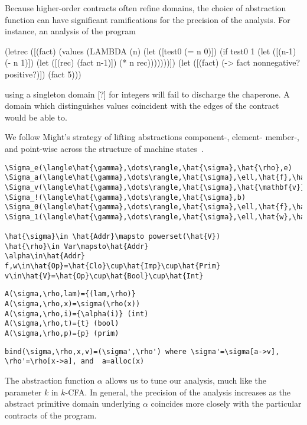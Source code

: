 \documentclass{sigplanconf}
\begin{document}
Because higher-order contracts often refine domains, the choice of abstraction function can have significant ramifications for the precision of the analysis.
For instance, an analysis of the program
\begin{schemedisplay}
(letrec ([(fact) (values (LAMBDA (n)
                          (let ([test0 (= n 0)])
                            (if test0
                                1
                                (let ([(n-1) (- n 1)])
                                  (let ([(rec) (fact n-1)])
                                    (* n rec)))))))])
  (let ([(fact) (-> fact nonnegative? positive?)])
    (fact 5)))
\end{schemedisplay}
using a singleton domain [?] for integers will fail to discharge the chaperone.
A domain which distinguishes values coincident with the edges of the contract would be able to.

We follow Might's strategy of lifting abstractions component-, element- member-, and point-wise across the structure of machine states~\cite{van2010abstracting}.

\begin{verbatim}
\Sigma_e(\langle\hat{\gamma},\dots\rangle,\hat{\sigma},\hat{\rho},e)
\Sigma_a(\langle\hat{\gamma},\dots\rangle,\hat{\sigma},\ell,\hat{f},\hat{\mathbf{v}})
\Sigma_v(\langle\hat{\gamma},\dots\rangle,\hat{\sigma},\hat{\mathbf{v}})
\Sigma_!(\langle\hat{\gamma},\dots\rangle,\hat{\sigma},b)
\Sigma_0(\langle\hat{\gamma},\dots\rangle,\hat{\sigma},\ell,\hat{f},\hat{w},\hat{\mathbf{v}})
\Sigma_1(\langle\hat{\gamma},\dots\rangle,\hat{\sigma},\ell,\hat{w},\hat{\mathbf{v}})

\hat{\sigma}\in \hat{Addr}\mapsto powerset(\hat{V})
\hat{\rho}\in Var\mapsto\hat{Addr}
\alpha\in\hat{Addr}
f,w\in\hat{Op}=\hat{Clo}\cup\hat{Imp}\cup\hat{Prim}
v\in\hat{V}=\hat{Op}\cup\hat{Bool}\cup\hat{Int}
\end{verbatim}

\begin{verbatim}
A(\sigma,\rho,lam)={(lam,\rho)}
A(\sigma,\rho,x)=\sigma(\rho(x))
A(\sigma,\rho,i)={\alpha(i)} (int)
A(\sigma,\rho,t)={t} (bool)
A(\sigma,\rho,p)={p} (prim)
\end{verbatim}

\begin{verbatim}
bind(\sigma,\rho,x,v)=(\sigma',\rho') where \sigma'=\sigma[a->v], \rho'=\rho[x->a], and  a=alloc(x)
\end{verbatim}

The abstraction function $\alpha$ allows us to tune our analysis, much like the parameter $k$ in $k$-CFA.
In general, the precision of the analysis increases as the abstract primitive domain underlying $\alpha$ coincides more closely with the particular contracts of the program.
\end{document}
